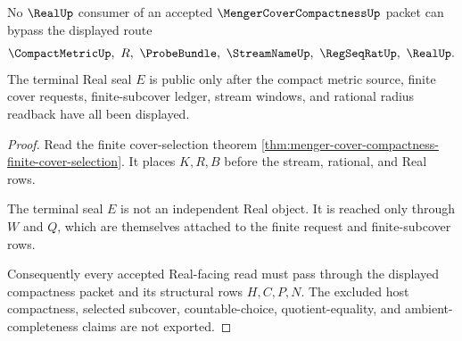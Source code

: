 \begin{theorem}
\label{thm:menger-cover-compactness-real-seal-nonescape}
No $\RealUp$ consumer of an accepted $\MengerCoverCompactnessUp$ packet can bypass the displayed route
$$
\CompactMetricUp,\ R,\ \ProbeBundle,\ \StreamNameUp,\ \RegSeqRatUp,\ \RealUp .
$$
The terminal Real seal $E$ is public only after the compact metric source, finite cover requests, finite-subcover ledger, stream windows, and rational radius readback have all been displayed.
\end{theorem}
\begin{proof}
Read the finite cover-selection theorem \autoref{thm:menger-cover-compactness-finite-cover-selection}. It places $K,R,B$ before the stream, rational, and Real rows.

The terminal seal $E$ is not an independent Real object. It is reached only through $W$ and $Q$, which are themselves attached to the finite request and finite-subcover rows.

Consequently every accepted Real-facing read must pass through the displayed compactness packet and its structural rows $H,C,P,N$. The excluded host compactness, selected subcover, countable-choice, quotient-equality, and ambient-completeness claims are not exported.
\end{proof}




